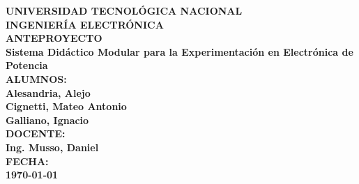 \begin{titlepage}
    \centering
    \vspace*{2cm}
    
    \textbf{\Large{UNIVERSIDAD TECNOLÓGICA NACIONAL}} \\ [0.3cm]
    
    \textbf{\Large{INGENIERÍA ELECTRÓNICA}}\\ [2cm]
    
    \textbf{\Huge{ANTEPROYECTO}}\\ [2cm]
    
    \textbf{\LARGE{Sistema Didáctico Modular para la Experimentación en Electrónica de Potencia}}\\ [6cm]
    
    \textbf{\Large{ALUMNOS:}}\\
    \textbf{Alesandria, Alejo}\\
    \textbf{Cignetti, Mateo Antonio}\\
    \textbf{Galliano, Ignacio}\\[1cm]
    
    \textbf{\Large{DOCENTE:}}\\
    \textbf{Ing. Musso, Daniel}\\[1cm]
    
    \textbf{\Large{FECHA:}}\\[0.3cm]
    \textbf{\today}\\[3cm]
    
    \vfill
\end{titlepage}